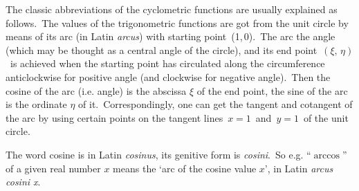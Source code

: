 \documentclass[12pt]{article}
\begin{document}
The classic abbreviations of the cyclometric functions are usually explained as follows.\, The values of the trigonometric functions are got from the unit circle by means of its arc (in Latin {\em arcus}) with starting point 
\,(1,\,0).\, The arc  the angle (which may be thought as a central angle of the circle), and its end point\, $(\xi,\,\eta)$\, is achieved when the starting point has circulated along the circumference anticlockwise for positive angle (and clockwise for negative angle).\, Then the cosine of the arc (i.e. angle) is the abscissa $\xi$ of the end point, the sine of the arc is the ordinate $\eta$ of it.\, Correspondingly, one can get the tangent and cotangent of the arc by using certain points on the tangent lines\, $x = 1$\, and\, $y = 1$\, of the unit circle.

The word cosine is in Latin {\em cosinus}, its genitive form is {\em cosini}.\, So e.g. ``$\arccos$'' of a given real number $x$ means the `arc of the cosine value $x$', in Latin {\em arcus cosini x}.
\end{document}
